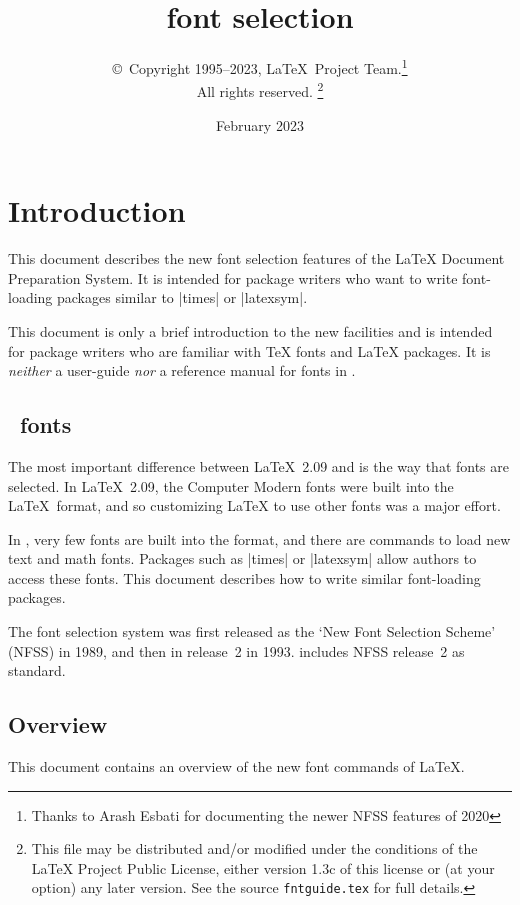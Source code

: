\documentclass{ltxguide}[1995/11/28]
\title{\LaTeXe{} font selection}
\author{\copyright~Copyright 1995--2023, \LaTeX\ Project
  Team.\thanks{Thanks to Arash Esbati for documenting the
    newer NFSS features of 2020}\\
  All rights reserved.%
  \footnote{This file may be distributed and/or modified under the
    conditions of the \LaTeX{} Project Public License, either version 1.3c
    of this license or (at your option) any later version. See the source
   \texttt{fntguide.tex} for full details.}%
}
\date{February 2023}
\begin{document}
\maketitle

\tableofcontents

\section{Introduction}

This document describes the new font selection features of the \LaTeX{}
Document Preparation System.  It is intended for package writers who
want to write font-loading packages similar to |times| or |latexsym|.

This document is only a brief introduction to the new facilities and is
intended for package writers who are familiar with \TeX{} fonts and
\LaTeX{} packages.  It is \emph{neither} a user-guide \emph{nor} a
reference manual for fonts in \LaTeXe.

\subsection{\LaTeXe~fonts}

The most important difference between \LaTeX~2.09 and \LaTeXe{} is the
way that fonts are selected.  In \LaTeX~2.09, the Computer Modern fonts
were built into the \LaTeX~format, and so customizing \LaTeX{} to use
other fonts was a major effort.

In \LaTeXe, very few fonts are built into the format, and there are
commands to load new text and math fonts.  Packages such as |times| or
|latexsym| allow authors to access these fonts.  This document describes
how to write similar font-loading packages.

The \LaTeXe{} font selection system was first released as the `New Font
Selection Scheme' (NFSS) in 1989, and then in release~2 in 1993.
\LaTeXe{} includes NFSS release~2 as standard.

\subsection{Overview}

This document contains an overview of the new font commands of \LaTeX.
\end{document}
